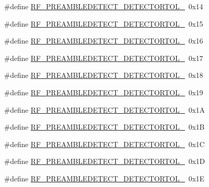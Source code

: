 \begin{DoxyCompactItemize}
\item 
\#define \mbox{\hyperlink{sx1276_regs-_fsk_8h_a685d199aafb86300e1bbcc48cd2b5646}{R\+F\+\_\+\+P\+R\+E\+A\+M\+B\+L\+E\+D\+E\+T\+E\+C\+T\+\_\+\+D\+E\+T\+E\+C\+T\+O\+R\+T\+O\+L\+\_}}~0x14
\item 
\#define \mbox{\hyperlink{sx1276_regs-_fsk_8h_aeb0a1361059deb9b9d086027dbfc1e9e}{R\+F\+\_\+\+P\+R\+E\+A\+M\+B\+L\+E\+D\+E\+T\+E\+C\+T\+\_\+\+D\+E\+T\+E\+C\+T\+O\+R\+T\+O\+L\+\_}}~0x15
\item 
\#define \mbox{\hyperlink{sx1276_regs-_fsk_8h_a047c2d4c92a0348034cb38f31878a72a}{R\+F\+\_\+\+P\+R\+E\+A\+M\+B\+L\+E\+D\+E\+T\+E\+C\+T\+\_\+\+D\+E\+T\+E\+C\+T\+O\+R\+T\+O\+L\+\_}}~0x16
\item 
\#define \mbox{\hyperlink{sx1276_regs-_fsk_8h_a2e8f5ccecf0338fbb43c7aace746214b}{R\+F\+\_\+\+P\+R\+E\+A\+M\+B\+L\+E\+D\+E\+T\+E\+C\+T\+\_\+\+D\+E\+T\+E\+C\+T\+O\+R\+T\+O\+L\+\_}}~0x17
\item 
\#define \mbox{\hyperlink{sx1276_regs-_fsk_8h_aef7179fc37f80c1dcf77e12ebafa1b50}{R\+F\+\_\+\+P\+R\+E\+A\+M\+B\+L\+E\+D\+E\+T\+E\+C\+T\+\_\+\+D\+E\+T\+E\+C\+T\+O\+R\+T\+O\+L\+\_}}~0x18
\item 
\#define \mbox{\hyperlink{sx1276_regs-_fsk_8h_ab5b2d80ff0b029a3de2dd04b83fc4313}{R\+F\+\_\+\+P\+R\+E\+A\+M\+B\+L\+E\+D\+E\+T\+E\+C\+T\+\_\+\+D\+E\+T\+E\+C\+T\+O\+R\+T\+O\+L\+\_}}~0x19
\item 
\#define \mbox{\hyperlink{sx1276_regs-_fsk_8h_ab588e51e9deb46dc1349326566bde157}{R\+F\+\_\+\+P\+R\+E\+A\+M\+B\+L\+E\+D\+E\+T\+E\+C\+T\+\_\+\+D\+E\+T\+E\+C\+T\+O\+R\+T\+O\+L\+\_}}~0x1A
\item 
\#define \mbox{\hyperlink{sx1276_regs-_fsk_8h_a73aa24ae139867b133532a5c8c0be09f}{R\+F\+\_\+\+P\+R\+E\+A\+M\+B\+L\+E\+D\+E\+T\+E\+C\+T\+\_\+\+D\+E\+T\+E\+C\+T\+O\+R\+T\+O\+L\+\_}}~0x1B
\item 
\#define \mbox{\hyperlink{sx1276_regs-_fsk_8h_ad119978aa14dfd4d1505c29a6732c11e}{R\+F\+\_\+\+P\+R\+E\+A\+M\+B\+L\+E\+D\+E\+T\+E\+C\+T\+\_\+\+D\+E\+T\+E\+C\+T\+O\+R\+T\+O\+L\+\_}}~0x1C
\item 
\#define \mbox{\hyperlink{sx1276_regs-_fsk_8h_aae822debf5d31da445ec5836bd6c293b}{R\+F\+\_\+\+P\+R\+E\+A\+M\+B\+L\+E\+D\+E\+T\+E\+C\+T\+\_\+\+D\+E\+T\+E\+C\+T\+O\+R\+T\+O\+L\+\_}}~0x1D
\item 
\#define \mbox{\hyperlink{sx1276_regs-_fsk_8h_a909bc72cec5165d5a6374b88b5d3ea6a}{R\+F\+\_\+\+P\+R\+E\+A\+M\+B\+L\+E\+D\+E\+T\+E\+C\+T\+\_\+\+D\+E\+T\+E\+C\+T\+O\+R\+T\+O\+L\+\_}}~0x1E
\item 

\end{DoxyCompactItemize}
